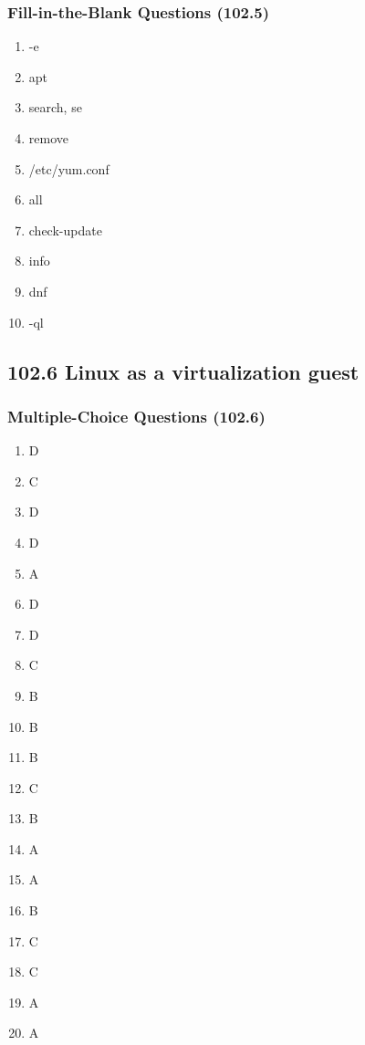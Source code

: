 \documentclass[a4paper]{report}
\begin{document}
\subsubsection*{Fill-in-the-Blank Questions (102.5)}
\begin{enumerate}[1.]
    \item -e
    \item apt
    \item search, se
    \item remove
    \item /etc/yum.conf
    \item all
    \item check-update
    \item info
    \item dnf
    \item -ql
\end{enumerate}

\subsection*{102.6 Linux as a virtualization guest}
\subsubsection*{Multiple-Choice Questions (102.6)}
\begin{enumerate}[1.]
    \item D
    \item C
    \item D
    \item D
    \item A
    \item D
    \item D
    \item C
    \item B
    \item B
    \item B
    \item C
    \item B
    \item A
    \item A
    \item B
    \item C
    \item C
    \item A
    \item A
\end{enumerate}
\end{document}
